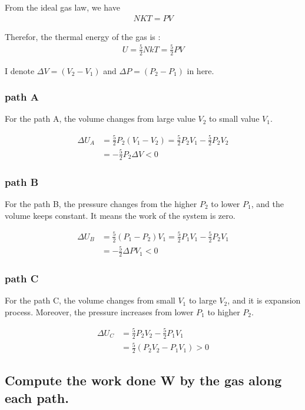 \documentclass[a4paper,11pt]{article}
\begin{document}
\quad \quad From the ideal gas law, we have 
\begin{align*}
NKT = PV
\end{align*}

Therefor, the thermal energy of the gas is :
\begin{align*}
U = \frac{5}{2}NkT = \frac{5}{2}PV
\end{align*}

I denote $\Delta V = (V_2 -V_1)$ and $\Delta P = (P_2 -P_1)$  in here.


\subsubsection{path A}
For the path A, the volume changes from large value $V_2$ to small value $V_1$.

\begin{align*}
\Delta  U_A & = \frac{5}{2}P_2(V_1-V_2) = \frac{5}{2}P_2V_1-\frac{5}{2}P_2V_2 \\
& =  -\frac{5}{2}P_2\Delta V <0
\end{align*}


\subsubsection{path B}
For the path B, the pressure changes from the higher $P_2$ to lower $P_1$, and the volume keeps constant. It means the work of the system is zero. 

\begin{align*}
\Delta U_B & = \frac{5}{2}(P_1-P_2)V_1 
=  \frac{5}{2}P_1V_1-\frac{5}{2}P_2V_1 
\\
& = -\frac{5}{2}\Delta PV_1 <0
\end{align*}



\subsubsection{path C}
For the path C, the volume changes from small $V_1$ to large  $V_2$, and it is expansion process. Moreover, the pressure increases from lower $P_1$ to higher $P_2$.

\begin{align*}
\Delta U_C & = \frac{5}{2}P_2V_2 -\frac{5}{2}P_1V_1
\\
& = \frac{5}{2} (P_2V_2 - P_1V_1 ) >0
\end{align*}



\subsection[1.3]{Compute the work done W by the gas along each path.}
\end{document}

